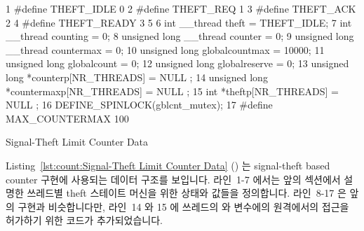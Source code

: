 \begin{listing}[tbp]
{ \scriptsize
\begin{verbbox}
  1 #define THEFT_IDLE  0
  2 #define THEFT_REQ   1
  3 #define THEFT_ACK   2
  4 #define THEFT_READY 3
  5 
  6 int __thread theft = THEFT_IDLE;
  7 int __thread counting = 0;
  8 unsigned long __thread counter = 0;
  9 unsigned long __thread countermax = 0;
 10 unsigned long globalcountmax = 10000;
 11 unsigned long globalcount = 0;
 12 unsigned long globalreserve = 0;
 13 unsigned long *counterp[NR_THREADS] = { NULL };
 14 unsigned long *countermaxp[NR_THREADS] = { NULL };
 15 int *theftp[NR_THREADS] = { NULL };
 16 DEFINE_SPINLOCK(gblcnt_mutex);
 17 #define MAX_COUNTERMAX 100
\end{verbbox}
}
\centering
\theverbbox
\caption{Signal-Theft Limit Counter Data}
\label{lst:count:Signal-Theft Limit Counter Data}
\end{listing}

Listing~\ref{lst:count:Signal-Theft Limit Counter Data}
()
는 signal-theft based counter 구현에 사용되는 데이터 구조를 보입니다.
라인~1-7 에서는 앞의 섹션에서 설명한 쓰레드별 theft 스테이트 머신을 위한 상태와
값들을 정의합니다.
라인~8-17 은 앞의 구현과 비슷합니다만, 라인~14 와 15 에 쓰레드의
 와  변수에의 원격에서의 접근을 허가하기 위한 코드가
추가되었습니다.

